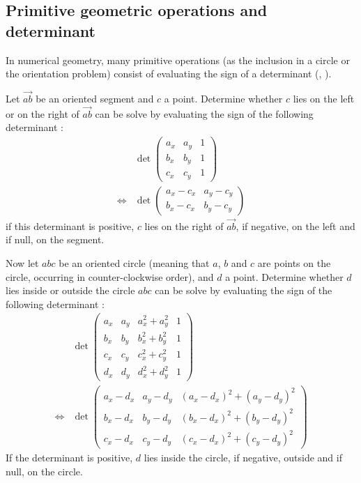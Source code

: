 \subsection{Primitive geometric operations and determinant}
In numerical geometry, many primitive operations (as the inclusion in a circle or the orientation problem) consist of evaluating the sign of a determinant (\cite{bronnimann2000efficient}, \cite{robust}).

Let $\overrightarrow{ab}$ be an oriented segment and $c$ a point. Determine whether $c$ lies on the left or on the right of $\overrightarrow{ab}$ can be solve by evaluating the sign of the following determinant : 
\begin{align}
& \det \begin{pmatrix}
a_x & a_y & 1\\
b_x & b_y & 1\\
c_x & c_y & 1
\end{pmatrix} \label{eq:detOrientation1}\\
\Leftrightarrow & \det \begin{pmatrix}
a_x - c_x & a_y - c_y \\
b_x - c_x & b_y - c_y
\end{pmatrix} \label{eq:detOrientation2}
\end{align}
if this determinant is positive, $c$ lies on the right of $\overrightarrow{ab}$, if negative, on the left and if null, on the segment.


Now let $abc$ be an oriented circle (meaning that $a$, $b$ and $c$ are points on the circle, occurring in counter-clockwise order), and $d$ a point. Determine whether $d$ lies inside or outside the circle $abc$ can be solve by evaluating the sign of the following determinant : 
\begin{align}
& \det \begin{pmatrix}
a_x & a_y & a_x^2 + a_y ^2 & 1\\
b_x & b_y & b_x^2 + b_y^2 & 1\\
c_x & c_y & c_x^2+c_y^2 & 1 \\
d_x & d_y & d_x^2+d_y^2 & 1
\end{pmatrix} \label{eq:Incircle1}\\
\Leftrightarrow & \det \begin{pmatrix}
a_x-d_x & a_y-d_y & (a_x-d_x)^2 + (a_y - d_y)^2\\
b_x-d_x & b_y - d_y & (b_x-d_x)^2 + (b_y - d_y)^2\\
c_x-d_x & c_y - d_y & (c_x-d_x)^2 + (c_y - d_y)^2
\end{pmatrix} \label{eq:Incircle2}
\end{align}
If the determinant is positive, $d$ lies inside the circle, if negative, outside and if null, on the circle.

